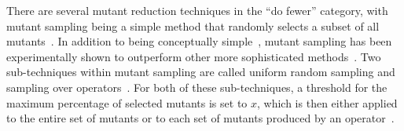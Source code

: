 

There are several mutant reduction techniques in the ``do fewer'' category, with mutant sampling being a simple method
that randomly selects a subset of all mutants~\cite{wong1995reducing}. In addition to being conceptually
simple~\cite{gopinath2015mutation}, mutant sampling has been experimentally shown to outperform other more sophisticated
methods~\cite{zhang2010operator}.  Two sub-techniques within mutant sampling are called uniform random sampling and
sampling over operators~\cite{gopinath2015mutation, gopinath2015empirical}.  For both of these sub-techniques, a
threshold for the maximum percentage of selected mutants is set to $x$, which is then either applied to the entire set
of mutants or to each set of mutants produced by an operator~\cite{gopinath2015mutation, gopinath2015empirical}.






